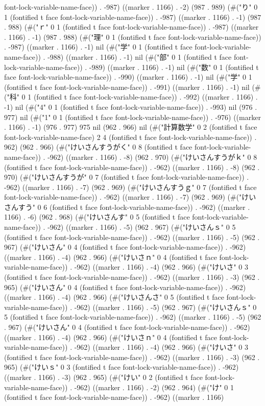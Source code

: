 font-lock-variable-name-face)) . -987) ((marker . 1166) . -2) (987 . 989) (#("り" 0 1 (fontified t face font-lock-variable-name-face)) . -987) ((marker . 1166) . -1) (987 . 988) (#("ｒ" 0 1 (fontified t face font-lock-variable-name-face)) . -987) ((marker . 1166) . -1) (987 . 988) (#("理" 0 1 (fontified t face font-lock-variable-name-face)) . -987) ((marker . 1166) . -1) nil (#("学" 0 1 (fontified t face font-lock-variable-name-face)) . -988) ((marker . 1166) . -1) nil (#("部" 0 1 (fontified t face font-lock-variable-name-face)) . -989) ((marker . 1166) . -1) nil (#("数" 0 1 (fontified t face font-lock-variable-name-face)) . -990) ((marker . 1166) . -1) nil (#("学" 0 1 (fontified t face font-lock-variable-name-face)) . -991) ((marker . 1166) . -1) nil (#("科" 0 1 (fontified t face font-lock-variable-name-face)) . -992) ((marker . 1166) . -1) nil (#("4" 0 1 (fontified t face font-lock-variable-name-face)) . -993) nil (976 . 977) nil (#("1" 0 1 (fontified t face font-lock-variable-name-face)) . -976) ((marker . 1166) . -1) (976 . 977) 975 nil (962 . 966) nil (#("計算数学" 0 2 (fontified t face font-lock-variable-name-face) 2 4 (fontified t face font-lock-variable-name-face)) . 962) (962 . 966) (#("けいさんすうがく" 0 8 (fontified t face font-lock-variable-name-face)) . -962) ((marker . 1166) . -8) (962 . 970) (#("けいさんすうがｋ" 0 8 (fontified t face font-lock-variable-name-face)) . -962) ((marker . 1166) . -8) (962 . 970) (#("けいさんすうが" 0 7 (fontified t face font-lock-variable-name-face)) . -962) ((marker . 1166) . -7) (962 . 969) (#("けいさんすうｇ" 0 7 (fontified t face font-lock-variable-name-face)) . -962) ((marker . 1166) . -7) (962 . 969) (#("けいさんすう" 0 6 (fontified t face font-lock-variable-name-face)) . -962) ((marker . 1166) . -6) (962 . 968) (#("けいさんす" 0 5 (fontified t face font-lock-variable-name-face)) . -962) ((marker . 1166) . -5) (962 . 967) (#("けいさんｓ" 0 5 (fontified t face font-lock-variable-name-face)) . -962) ((marker . 1166) . -5) (962 . 967) (#("けいさん" 0 4 (fontified t face font-lock-variable-name-face)) . -962) ((marker . 1166) . -4) (962 . 966) (#("けいさｎ" 0 4 (fontified t face font-lock-variable-name-face)) . -962) ((marker . 1166) . -4) (962 . 966) (#("けいさ" 0 3 (fontified t face font-lock-variable-name-face)) . -962) ((marker . 1166) . -3) (962 . 965) (#("けいさん" 0 4 (fontified t face font-lock-variable-name-face)) . -962) ((marker . 1166) . -4) (962 . 966) (#("けいさんさ" 0 5 (fontified t face font-lock-variable-name-face)) . -962) ((marker . 1166) . -5) (962 . 967) (#("けいさんｓ" 0 5 (fontified t face font-lock-variable-name-face)) . -962) ((marker . 1166) . -5) (962 . 967) (#("けいさん" 0 4 (fontified t face font-lock-variable-name-face)) . -962) ((marker . 1166) . -4) (962 . 966) (#("けいさｎ" 0 4 (fontified t face font-lock-variable-name-face)) . -962) ((marker . 1166) . -4) (962 . 966) (#("けいさ" 0 3 (fontified t face font-lock-variable-name-face)) . -962) ((marker . 1166) . -3) (962 . 965) (#("けいｓ" 0 3 (fontified t face font-lock-variable-name-face)) . -962) ((marker . 1166) . -3) (962 . 965) (#("けい" 0 2 (fontified t face font-lock-variable-name-face)) . -962) ((marker . 1166) . -2) (962 . 964) (#("け" 0 1 (fontified t face font-lock-variable-name-face)) . -962) ((marker . 1166) 